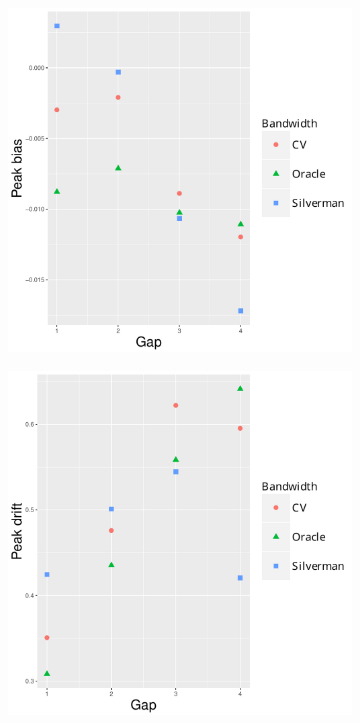 \begin{figure}[htbp]
    \centering
    \begin{subfigure}[b]{0.24\textwidth}
        \includegraphics[width=\textwidth]{results/by_two_peaks/peak-bias-vs-risk-peak-gap}
        \caption{}
        \label{fig:other_measures:p1.4_100_G:peak_bias}
    \end{subfigure}
    \begin{subfigure}[b]{0.24\textwidth}
        \includegraphics[width=\textwidth]{results/by_two_peaks/peak-drift-vs-risk-peak-gap}

\end{subfigure}
\end{figure}

